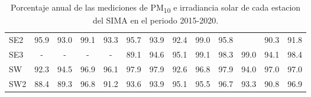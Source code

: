 \begin{table}[H]
\begin{tabular}{lcccccccccccc}
        SE2                                        & 95.9                     & 93.0                                                & 99.1                     & 93.3                     & 95.7                     & 93.9                     & 92.4                 & 99.0 & 95.8                 & \cellcolor[HTML]{CB0000}{\color[HTML]{FFFFFF} 64.1} & 90.3                                                & 91.8                                                \\
        SE3                                        & -                        & -                                                   & -                        & -                        & 89.1                     & 94.6                     & 95.1                 & 99.1 & 98.3                 & 99.0                                                & 94.1                                                & 98.4                                                \\
        SW                                         & 92.3                     & 94.5                                                & 96.9                     & 96.1                     & 97.9                     & 97.9                     & 92.6                 & 96.8 & 97.9                 & 94.0                                                & 97.0                                                & 97.0                                                \\
        SW2                                        & 88.4                     & 89.3                                                & 96.8                     & 91.2                     & 93.6                     & 93.9                     & 95.1                 & 95.5 & 96.7                 & 93.3                                                & 90.8                                                & 96.9                                                \\ \hline
    \end{tabular}
    \caption{Porcentaje anual de las mediciones de PM\textsubscript{10} e irradiancia solar de cada estacion del SIMA en el periodo 2015-2020.}
    \label{table:measurements_SIMA}
\end{table}